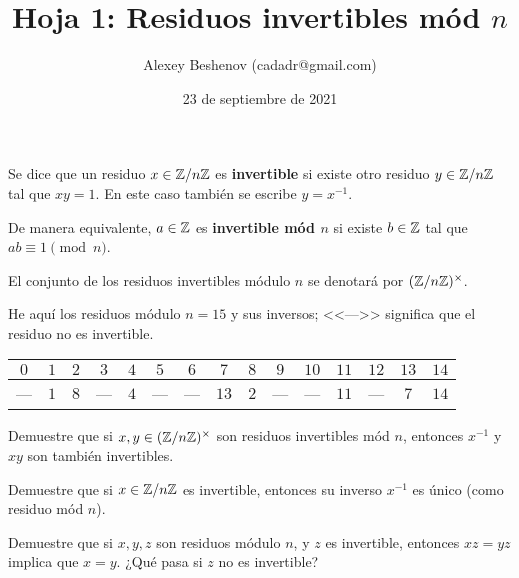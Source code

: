 \documentclass{article}
\title{Hoja 1: Residuos invertibles mód $n$}
\author{Alexey Beshenov (cadadr@gmail.com)}
\date{23 de septiembre de 2021}
\begin{document}
\maketitle
\thispagestyle{empty}

\setcounter{section}{1}

\begin{definicion}
  Se dice que un residuo $x \in \mathbb{Z}/n\mathbb{Z}$ es \textbf{invertible} si existe otro
  residuo $y \in \mathbb{Z}/n\mathbb{Z}$ tal que $xy = 1$. En este caso también se escribe
  $y = x^{-1}$.

  De manera equivalente, $a \in \mathbb{Z}$ es \textbf{invertible mód $n$} si existe
  $b \in \mathbb{Z}$ tal que $ab \equiv 1 \pmod{n}$.
\end{definicion}

El conjunto de los residuos invertibles módulo $n$ se denotará por
$(\mathbb{Z}/n\mathbb{Z})^\times$.

\begin{ejemplo}
  He aquí los residuos módulo $n = 15$ y sus inversos; <<--->> significa que el
  residuo no es invertible.

  \begin{center}
    \begin{tabular}{ccccccccccccccc}
      \hline
      $0$ & $1$ & $2$ & $3$ & $4$ & $5$ & $6$ & $7$ & $8$ & $9$ & $10$ & $11$ & $12$ & $13$ & $14$ \\
      \hline
      --- & $1$ & $8$ & --- & $4$ & --- & --- & $13$ & $2$ & --- & --- & $11$ & --- & $7$ & $14$ \\
      \hline
    \end{tabular}
  \end{center}
\end{ejemplo}

\begin{problema}
  Demuestre que si $x, y \in (\mathbb{Z}/n\mathbb{Z})^\times$ son residuos invertibles mód
  $n$, entonces $x^{-1}$ y $xy$ son también invertibles.
\end{problema}

\begin{problema}
  Demuestre que si $x \in \mathbb{Z}/n\mathbb{Z}$ es invertible, entonces su inverso $x^{-1}$
  es único (como residuo mód $n$).
\end{problema}

\begin{problema}[Cancelación]
  Demuestre que si $x,y,z$ son residuos módulo $n$, y $z$ es invertible,
  entonces $xz = yz$ implica que $x = y$. ¿Qué pasa si $z$ no es invertible?
\end{problema}
\end{document}
